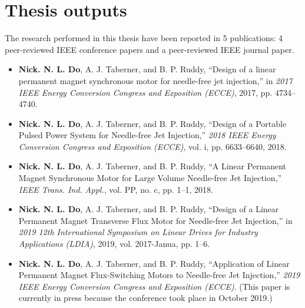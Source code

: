 \section{Thesis outputs}

The research performed in this thesis have been reported in 5 publications: 4 peer-reviewed IEEE conference papers and a peer-reviewed IEEE journal paper. 

\begin{itemize}
    \item \textbf{Nick. N. L. Do}, A. J. Taberner, and B. P. Ruddy, “Design of a linear permanent magnet synchronous motor for needle-free jet injection,” in \textit{2017 IEEE Energy Conversion Congress and Exposition (ECCE)}, 2017, pp. 4734–4740.
    \item \textbf{Nick. N. L. Do}, A. J. Taberner, and B. P. Ruddy, “Design of a Portable Pulsed Power System for Needle-free Jet Injection,” \textit{2018 IEEE Energy Conversion Congress and Exposition (ECCE)}, vol. i, pp. 6633–6640, 2018.
    \item \textbf{Nick. N. L. Do}, A. J. Taberner, and B. P. Ruddy, “A Linear Permanent Magnet Synchronous Motor for Large Volume Needle-free Jet Injection,” \textit{IEEE Trans. Ind. Appl.}, vol. PP, no. c, pp. 1–1, 2018.
    \item \textbf{Nick. N. L. Do}, A. J. Taberner, and B. P. Ruddy, “Design of a Linear Permanent Magnet Transverse Flux Motor for Needle-free Jet Injection,” in \textit{2019 12th International Symposium on Linear Drives for Industry Applications (LDIA)}, 2019, vol. 2017-Janua, pp. 1–6.
    \item \textbf{Nick. N. L. Do}, A. J. Taberner, and B. P. Ruddy, “Application of Linear Permanent Magnet Flux-Switching Motors to Needle-free Jet Injection,” \textit{2019 IEEE Energy Conversion Congress and Exposition (ECCE)}. (This paper is currently in press because the conference took place in October 2019.)
\end{itemize}